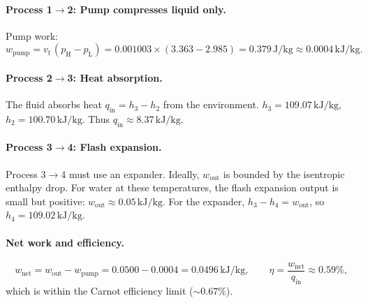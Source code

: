 \documentclass[11pt,a4paper]{article}
\begin{document}
\paragraph{Process 1$\to$2: Pump compresses liquid only.}
Pump work:
\begin{equation}
\label{eq:pump_work}
w_{\mathrm{pump}} = v_{\mathrm{f}}\,(p_{\mathrm{H}} - p_{\mathrm{L}})
= 0.001003 \times (3.363 - 2.985) = 0.379\,\mathrm{J}/\mathrm{kg}
\approx 0.0004\,\mathrm{kJ}/\mathrm{kg}.
\end{equation}

\paragraph{Process 2$\to$3: Heat absorption.}
The fluid absorbs heat $q_{\mathrm{in}} = h_3 - h_2$ from the environment. 
$h_3 = 109.07\,\mathrm{kJ}/\mathrm{kg}$, $h_2 = 100.70\,\mathrm{kJ}/\mathrm{kg}$. 
Thus $q_{\mathrm{in}} \approx 8.37\,\mathrm{kJ}/\mathrm{kg}$.

\paragraph{Process 3$\to$4: Flash expansion.}
Process 3$\to$4 must use an expander. Ideally, $w_{\mathrm{out}}$ is bounded by 
the isentropic enthalpy drop. For water at these temperatures, the flash 
expansion output is small but positive: $w_{\mathrm{out}} \approx 0.05\,\mathrm{kJ}/\mathrm{kg}$.
For the expander, $h_3 - h_4 = w_{\mathrm{out}}$, so $h_4 = 109.02\,\mathrm{kJ}/\mathrm{kg}$.

\paragraph{Net work and efficiency.}
\begin{equation}
\label{eq:w_net}
w_{\mathrm{net}} = w_{\mathrm{out}} - w_{\mathrm{pump}} = 0.0500 - 0.0004
= 0.0496\,\mathrm{kJ}/\mathrm{kg},
\qquad
\eta = \frac{w_{\mathrm{net}}}{q_{\mathrm{in}}} \approx 0.59\%,
\end{equation}
which is within the Carnot efficiency limit ($\sim 0.67\%$).
\end{document}
